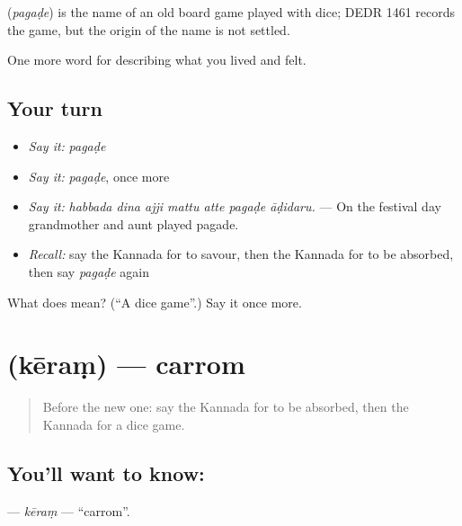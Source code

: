 \begin{cousinweb}
\textbf{} (\emph{pagaḍe}) is the name of an old board game played with dice; DEDR 1461 records the game, but the origin of the name is not settled.
\end{cousinweb}

\begin{grammarlens}[title={What you've built}]
One more word for describing what you lived and felt.
\end{grammarlens}

\subsection*{Your turn}
\begin{itemize}
\raggedright
  \item \emph{Say it:} \emph{pagaḍe}
  \item \emph{Say it:} \emph{pagaḍe}, once more
  \item \emph{Say it:} \emph{habbada dina ajji mattu atte pagaḍe āḍidaru.} — On the festival day grandmother and aunt played pagade.
  \item \emph{Recall:} say the Kannada for to savour, then the Kannada for to be absorbed, then say \emph{pagaḍe} again
\end{itemize}

\begin{tcolorbox}[breakable,colback=teal!4,colframe=teal!35!black,title={Before you move on}]
What does  mean? (\textquotedblleft{}A dice game\textquotedblright{}.) Say it once more.
\end{tcolorbox}
\section[\texorpdfstring{\kn{ಕೇರಂ} (kēraṃ)}{ಕೇರಂ (kēraṃ)}]{ (kēraṃ) — carrom}

\label{lesson:KA-C531-keram}



\begin{quote}
Before the new one: say the Kannada for to be absorbed, then the Kannada for a dice game.
\end{quote}

\subsection*{You'll want to know: }
\textbf{} — \emph{kēraṃ} — \textquotedblleft{}carrom\textquotedblright{}.

